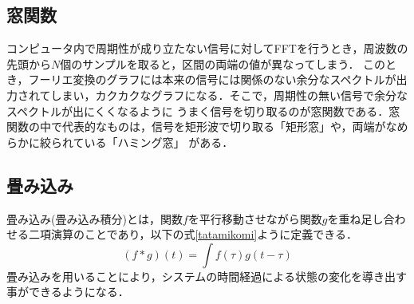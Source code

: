 \documentclass[a4paper,11pt]{jsarticle}
\begin{document}
\subsection{窓関数}
コンピュータ内で周期性が成り立たない信号に対してFFTを行うとき，周波数の先頭から$N$個のサンプルを取ると，区間の両端の値が異なってしまう．
このとき，フーリエ変換のグラフには本来の信号には関係のない余分なスペクトルが出力されてしまい，カクカクなグラフになる．そこで，周期性の無い信号で余分なスペクトルが出にくくなるように
うまく信号を切り取るのが窓関数\cite{window}である．窓関数の中で代表的なものは，信号を矩形波で切り取る「矩形窓」や，両端がなめらかに絞られている「ハミング窓」
がある．

\subsection{畳み込み}
畳み込み(畳み込み積分)\cite{tatamikomi}とは，関数$f$を平行移動させながら関数$g$を重ね足し合わせる二項演算のことであり，以下の式\ref{tatamikomi}ように定義できる．
\begin{equation}
  (f * g)(t) = \int{f(\tau)g(t-\tau)} \nonumber   \label{tatamikomi}
\end{equation}
畳み込みを用いることにより，システムの時間経過による状態の変化を導き出す事ができるようになる．
\end{document}
